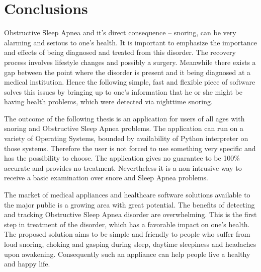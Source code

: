 \section*{Conclusions}

Obstructive Sleep Apnea and it's direct consequence -- snoring, can be very alarming and serious to one's health. It is important to emphasize the importance and effects of being diagnosed and treated from this disorder. The recovery process involves lifestyle changes and possibly a surgery. Meanwhile there exists a gap between the point where the disorder is present and it being diagnosed at a medical institution. Hence the following simple, fast and flexible piece of software solves this issues by bringing up to one's information that he or she might be having health problems, which were detected via nighttime snoring.

The outcome of the following thesis is an application for users of all ages with snoring and Obstructive Sleep Apnea problems. The application can run on a variety of Operating Systems, bounded by availability of Python interpreter on those systems. Therefore the user is not forced to use something very specific and has the possibility to choose. The application gives no guarantee to be 100\% accurate and provides no treatment. Nevertheless it is a non-intrusive way to receive a basic examination over snore and Sleep Apnea problems. 

The market of medical appliances and healthcare software solutions available to the major public is a growing area with great potential. The benefits of detecting and tracking Obstructive Sleep Apnea disorder are overwhelming. This is the first step in treatment of the disorder, which has a favorable impact on one's health. The proposed solution aims to be simple and friendly to people who suffer from loud snoring, choking and gasping during sleep, daytime sleepiness and headaches upon awakening. Consequently such an appliance can help people live a healthy and happy life.
\clearpage